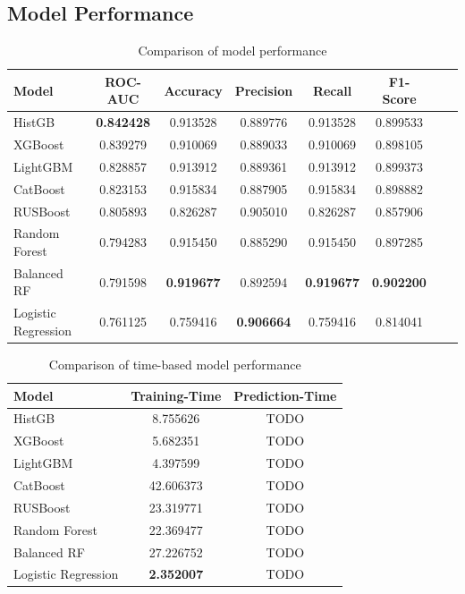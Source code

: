 \documentclass[12pt,letterpaper]{article}
\begin{document}
\subsection{Model Performance}
\begin{table}[H]
    \centering
    \begin{tabular}{|l|c|c|c|c|c|c|c|}
        \hline
        Model & ROC-AUC & Accuracy & Precision & Recall & F1-Score \\
        \hline

        HistGB & \textbf{0.842428} & 0.913528 & 0.889776 & 0.913528 & 0.899533 \\
        XGBoost & 0.839279 & 0.910069 & 0.889033 & 0.910069 & 0.898105 \\
        LightGBM & 0.828857 & 0.913912 & 0.889361 & 0.913912 & 0.899373 \\
        CatBoost & 0.823153 & 0.915834 & 0.887905 & 0.915834 & 0.898882 \\
        RUSBoost & 0.805893 & 0.826287 & 0.905010 & 0.826287 & 0.857906 \\
        Random Forest & 0.794283 & 0.915450 & 0.885290 & 0.915450 & 0.897285 \\
        Balanced RF & 0.791598 & \textbf{0.919677} & 0.892594 & \textbf{0.919677} & \textbf{0.902200} \\
        Logistic Regression & 0.761125 & 0.759416 & \textbf{0.906664} & 0.759416 & 0.814041 \\
        \hline
    \end{tabular}
    \caption{Comparison of model performance}
\end{table}

\begin{table}[H]
    \centering
    \begin{tabular}{|l|c|c|}
        \hline
        Model & Training-Time & Prediction-Time\\
        \hline

        HistGB & 8.755626 & TODO \\
        XGBoost & 5.682351 & TODO \\
        LightGBM & 4.397599 & TODO \\
        CatBoost & 42.606373 & TODO \\
        RUSBoost & 23.319771 & TODO \\
        Random Forest & 22.369477 & TODO \\
        Balanced RF & 27.226752 & TODO \\
        Logistic Regression & \textbf{2.352007} & TODO \\
        \hline
    \end{tabular}
    \caption{Comparison of time-based model performance}
\end{table}
\end{document}
